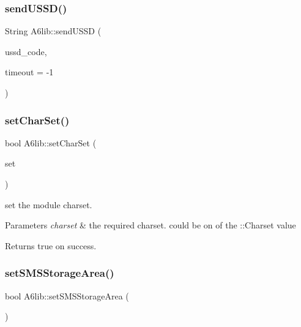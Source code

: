 \subsubsection{\texorpdfstring{send\+U\+S\+S\+D()}{sendUSSD()}}
{\footnotesize\ttfamily String A6lib\+::send\+U\+S\+SD (\begin{DoxyParamCaption}\item[{const String \&}]{ussd\+\_\+code,  }\item[{uint16\+\_\+t}]{timeout = {\ttfamily -\/1} }\end{DoxyParamCaption})}

\mbox{\label{class_a6lib_a190d29007bf7cec32f24eeca6dd212b0}} 
\subsubsection{\texorpdfstring{set\+Char\+Set()}{setCharSet()}}
{\footnotesize\ttfamily bool A6lib\+::set\+Char\+Set (\begin{DoxyParamCaption}\item[{\mbox{\hyperlink{_a6lib_8h_a05ab29788588d54d1b515588e8eb14b0}{Char\+Set}}}]{set }\end{DoxyParamCaption})}

set the module charset. 
\begin{DoxyParams}{Parameters}
{\em charset} & the required charset. could be on of the \+::\+Charset value \\
\hline
\end{DoxyParams}
\begin{DoxyReturn}{Returns}
true on success. 
\end{DoxyReturn}
\mbox{\label{class_a6lib_abd141d94b19ce4221c0aa692c34f9b42}} 
\subsubsection{\texorpdfstring{set\+S\+M\+S\+Storage\+Area()}{setSMSStorageArea()}}
{\footnotesize\ttfamily bool A6lib\+::set\+S\+M\+S\+Storage\+Area (\begin{DoxyParamCaption}\item[{\mbox{\hyperlink{_a6lib_8h_a683c3425c199702a4b8b13f7f2518af5}{S\+M\+S\+Storage\+Area}}}]{ }\end{DoxyParamCaption})}

